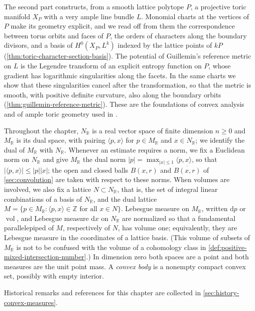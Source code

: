 The second part constructs, from a smooth lattice polytope $P$, a projective toric manifold $X_P$ with a very ample line bundle $L$. Monomial charts at the vertices of $P$ make its geometry explicit, and we read off from them the correspondence between torus orbits and faces of $P$, the orders of characters along the boundary divisors, and a basis of $H^0(X_P,L^k)$ indexed by the lattice points of $kP$ (\cref{thm:toric-character-section-basis}). The potential of Guillemin's reference metric on $L$ is the Legendre transform of an explicit entropy function on $P$, whose gradient has logarithmic singularities along the facets. In the same charts we show that these singularities cancel after the transformation, so that the metric is smooth, with positive definite curvature, also along the boundary orbits (\cref{thm:guillemin-reference-metric}). These are the foundations of convex analysis and of ample toric geometry used in \cite[Part I]{XiaSampleBook}.

Throughout the chapter, $N_{\mathbb R}$ is a real vector space of finite dimension $n\geq0$ and $M_{\mathbb R}$ is its dual space, with pairing $\langle p,x\rangle$ for $p\in M_{\mathbb R}$ and $x\in N_{\mathbb R}$; we identify the dual of $M_{\mathbb R}$ with $N_{\mathbb R}$. Whenever an estimate requires a norm, we fix a Euclidean norm on $N_{\mathbb R}$ and give $M_{\mathbb R}$ the dual norm $|p|=\max_{|x|\leq1}\langle p,x\rangle$, so that $|\langle p,x\rangle|\leq|p||x|$; the open and closed balls $B(x,r)$ and $\overline{B(x,r)}$ of \cref{sec:convolution} are taken with respect to these norms. When volumes are involved, we also fix a lattice $N\subset N_{\mathbb R}$, that is, the set of integral linear combinations of a basis of $N_{\mathbb R}$, and the dual lattice $M=\{p\in M_{\mathbb R}:\langle p,x\rangle\in\mathbb Z\text{ for all }x\in N\}$. Lebesgue measure on $M_{\mathbb R}$, written $\mathrm dp$ or $\operatorname{vol}$, and Lebesgue measure $\mathrm dx$ on $N_{\mathbb R}$ are normalized so that a fundamental parallelepiped of $M$, respectively of $N$, has volume one; equivalently, they are Lebesgue measure in the coordinates of a lattice basis. (This volume of subsets of $M_{\mathbb R}$ is not to be confused with the volume of a cohomology class in \cref{def:positive-mixed-intersection-number}.) In dimension zero both spaces are a point and both measures are the unit point mass. A \emph{convex body} is a nonempty compact convex set, possibly with empty interior.

Historical remarks and references for this chapter are collected in \cref{sec:history-convex-measures}.

